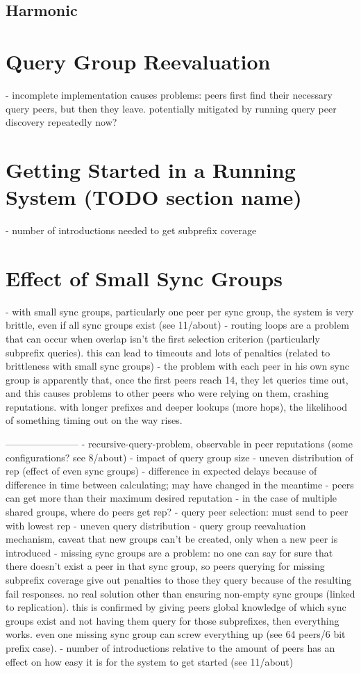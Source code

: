 \subsection{Harmonic}
\section{Query Group Reevaluation}
- incomplete implementation causes problems: peers first find their necessary
  query peers, but then they leave. potentially mitigated by running query peer
  discovery repeatedly now?
\section{Getting Started in a Running System (TODO section name)}
- number of introductions needed to get subprefix coverage
\section{Effect of Small Sync Groups}
- with small sync groups, particularly one peer per sync group, the system is
  very brittle, even if all sync groups exist (see 11/about)
- routing loops are a problem that can occur when overlap isn't the first
  selection criterion (particularly subprefix queries). this can lead to
  timeouts and lots of penalties (related to brittleness with small sync groups)
- the problem with each peer in his own sync group is apparently that, once the
  first peers reach 14, they let queries time out, and this causes problems to
  other peers who were relying on them, crashing reputations. with longer
  prefixes and deeper lookups (more hops), the likelihood of something timing
  out on the way rises.


-----------------------
- recursive-query-problem, observable in peer reputations (some configurations?
  see 8/about)
- impact of query group size
- uneven distribution of rep (effect of even sync groups)
- difference in expected delays because of difference in time between
  calculating; may have changed in the meantime
- peers can get more than their maximum desired reputation
- in the case of multiple shared groups, where do peers get rep?
- query peer selection: must send to peer with lowest rep
- uneven query distribution
- query group reevaluation mechanism, caveat that new groups can't be created,
  only when a new peer is introduced
- missing sync groups are a problem: no one can say for sure that there doesn't
  exist a peer in that sync group, so peers querying for missing subprefix
  coverage give out penalties to those they query because of the resulting fail
  responses. no real solution other than ensuring non-empty sync groups (linked
  to replication). this is confirmed by giving peers global knowledge of which
  sync groups exist and not having them query for those subprefixes, then
  everything works. even one missing sync group can screw everything up (see 64
  peers/6 bit prefix case).
- number of introductions relative to the amount of peers has an effect on how
  easy it is for the system to get started (see 11/about)
